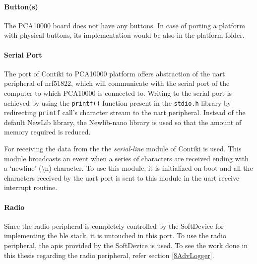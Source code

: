 \paragraph{Button(s)}
The PCA10000 board does not have any buttons. In case of porting a platform with physical buttons, its implementation would be also in the platform folder.

\paragraph{Serial Port}
The port of Contiki to PCA10000 platform offers abstraction of the \gls{uart} peripheral of nrf51822, which will communicate with the serial port of the computer to which PCA10000 is connected to. Writing to the serial port is achieved by using the \texttt{printf()} function present in the \texttt{stdio.h} library by redirecting \texttt{printf} call's character stream to the \gls{uart} peripheral. Instead of the default NewLib library, the Newlib-nano library is used so that the amount of memory required is reduced.

For receiving the data from the the \emph{serial-line} module of Contiki is used. This module broadcasts an event when a series of characters are received ending with a `newline' (\textbackslash n) character. To use this module, it is initialized on boot and all the characters received by the \gls{uart} port is sent to this module in the \gls{uart} receive interrupt routine.

\paragraph{Radio} 

Since the radio peripheral is completely controlled by the SoftDevice for implementing the \gls{ble} stack, it is untouched in this port. To use the radio peripheral, the \glspl{api} provided by the SoftDevice is used. To see the work done in this thesis regarding the radio peripheral, refer section \ref{8AdvLogger}.

